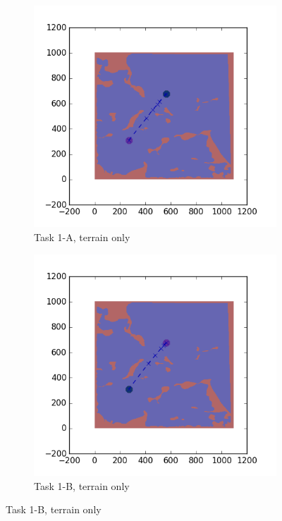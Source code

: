 \documentclass{tamuccthesis}
\begin{document}
\begin{figure}
    \centering
    \begin{subfigure}[b]{0.4\textwidth}
        \centering
        \includegraphics[width=\textwidth,trim={3cm 3cm 3cm 3cm},clip]{EXP3RG_PathAa_-1_-1_0_0.png}
        \caption[]{{\small Task 1-A, terrain only}}
        \label{fig:Path_1-A_terrain_only}
    \end{subfigure}
    \hfill
    \begin{subfigure}[b]{0.4\textwidth}  
        \centering 
        \includegraphics[width=\textwidth,trim={3cm 3cm 3cm 3cm},clip]{EXP3RG_PathAb_-1_-1_0_0.png}
        \caption[]{{\small Task 1-B, terrain only}}   
        \label{fig:Path_1-B_terrain_only}
    \end{subfigure}
    

\end{figure}
\end{document}
